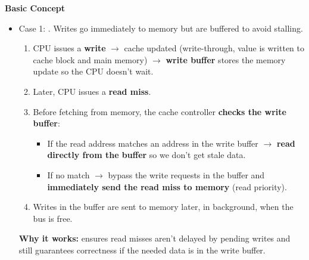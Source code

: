 \highspace
\begin{flushleft}
    \textcolor{Green3}{ \textbf{Basic Concept}}
\end{flushleft}
\begin{itemize}
    \item Case 1: . Writes go immediately to memory but are buffered to avoid stalling.
    \begin{enumerate}
        \item CPU issues a \textbf{write} $\rightarrow$ cache updated (write-through, value is written to cache block and main memory) $\rightarrow$ \textbf{write buffer} stores the memory update so the CPU doesn't wait.
        \item Later, CPU issues a \textbf{read miss}.
        \item Before fetching from memory, the cache controller \textbf{checks the write buffer}:
        \begin{itemize}
            \item If the read address matches an address in the write buffer $\rightarrow$ \textbf{read directly from the buffer} so we don't get stale data.
            \item If no match $\rightarrow$ bypass the write requests in the buffer and \textbf{immediately send the read miss to memory} (read priority).
        \end{itemize}
        \item Writes in the buffer are sent to memory later, in background, when the bus is free.
    \end{enumerate}
    \textcolor{Green3}{ \textbf{Why it works:}} ensures read misses aren't delayed by pending writes and still guarantees correctness if the needed data is in the write buffer.



\end{itemize}
